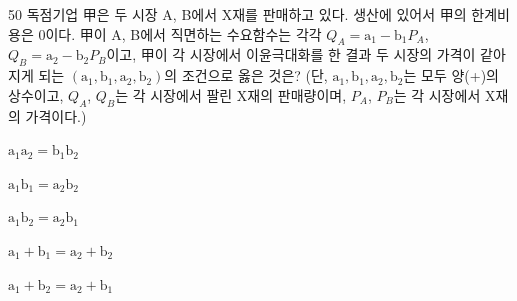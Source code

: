 \begin{question}{50}
독점기업 甲은 두 시장 A, B에서 X재를 판매하고 있다. 생산에 있어서 甲의 한계비용은 0이다. 甲이 A, B에서 직면하는 수요함수는 각각 $Q_A = \mathrm{a}_1 - \mathrm{b}_1P_A$, $Q_B = \mathrm{a}_2 - \mathrm{b}_2P_B$이고, 甲이 각 시장에서 이윤극대화를 한 결과 두 시장의 가격이 같아지게 되는 $(\mathrm{a}_1, \mathrm{b}_1, \mathrm{a}_2, \mathrm{b}_2)$의 조건으로 옳은 것은? (단, $\mathrm{a}_1, \mathrm{b}_1, \mathrm{a}_2, \mathrm{b}_2$는 모두 양(+)의 상수이고, $Q_A$, $Q_B$는 각 시장에서 팔린 X재의 판매량이며, $P_A$, $P_B$는 각 시장에서 X재의 가격이다.)
\begin{choices}
  \item $\mathrm{a}_1\mathrm{a}_2 = \mathrm{b}_1\mathrm{b}_2$
  \item $\mathrm{a}_1\mathrm{b}_1 = \mathrm{a}_2\mathrm{b}_2$
  \item $\mathrm{a}_1\mathrm{b}_2 = \mathrm{a}_2\mathrm{b}_1$
  \item $\mathrm{a}_1+\mathrm{b}_1 = \mathrm{a}_2+\mathrm{b}_2$
  \item $\mathrm{a}_1+\mathrm{b}_2 = \mathrm{a}_2+\mathrm{b}_1$
\end{choices}
\end{question}
